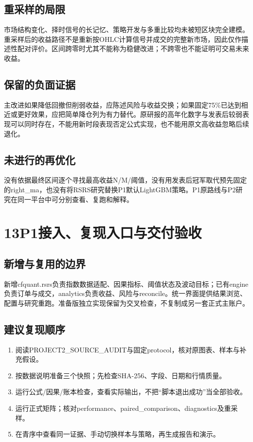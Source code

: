 \documentclass[UTF8,a4paper,10pt]{ctexart}
\newcommand{\page}[1]{\newpage\section*{#1}}
\begin{document}
\subsection*{重采样的局限}
市场结构变化、择时信号的长记忆、策略开发与多重比较均未被短区块完全建模。重采样后的收益路径不是重新按OHLC计算信号并成交的完整新市场，因此仅作描述性配对评价。区间跨零时尤其不能称为稳健改进；不跨零也不能证明可交易未来收益。
\subsection*{保留的负面证据}
主改进如果降低回撤但削弱收益，应陈述风险与收益交换；如果固定75\%已达到相近或更好效果，应把简单降仓列为有力替代。原研报的高年化数字与发表后较弱表现可以同时存在，不能用新时段表现否定公式实现，也不能用原文高收益忽略后续退化。
\subsection*{未进行的再优化}
没有依据最终区间逐个寻找最高收益N/M/阈值，没有用发表后冠军取代预先固定的right\_ma，也没有将RSRS研究替换P1默认LightGBM策略。P1原路线与P2研究在同一平台中可分别查看、复跑和解释。

\page{13\quad P1接入、复现入口与交付验收}
\begin{center}\end{center}
\subsection*{新增与复用的边界}
新增cfquant.rsrs负责指数数据适配、因果指标、阈值状态及波动目标；已有engine负责订单与成交，analytics负责收益、风险与reconcile。统一界面提供结果浏览、配置与研究重跑。准备版独立实现保留为交叉检查，不复制成另一套正式主账户。
\subsection*{建议复现顺序}
\begin{enumerate}\item 阅读PROJECT2\_SOURCE\_AUDIT与固定protocol，核对原图表、样本与补充假设。\item 按数据说明准备三个快照；先检查SHA-256、字段、日期和行情质量。\item 运行公式/因果/账本检查，查看实际输出，不把“脚本退出成功”当全部验收。\item 运行正式矩阵；核对performance、paired\_comparison、diagnostics及重采样。\item 在青序中查看同一证据、手动切换样本与策略，再生成报告和演示。\end{enumerate}
\end{document}
